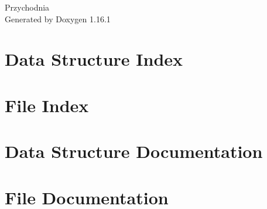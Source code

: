 \documentclass[twoside]{book}
\newcommand{\+}{\discretionary{\mbox{\scriptsize$\hookleftarrow$}}{}{}}
\newcommand{\clearemptydoublepage}{%
    \newpage{\pagestyle{empty}\cleardoublepage}%
  }
\begin{document}
  \raggedbottom
  \begin{titlepage}
  \vspace*{7cm}
  \begin{center}%
  {\Large Przychodnia}\\
  \vspace*{1cm}
  {\large Generated by Doxygen 1.16.1}\\
  \end{center}
  \end{titlepage}
  \clearemptydoublepage
  \tableofcontents
  \clearemptydoublepage
\chapter{Data Structure Index}

\chapter{File Index}

\chapter{Data Structure Documentation}



\chapter{File Documentation}













  \backmatter
  \newpage
  \clearemptydoublepage
  \printindex
\end{document}
